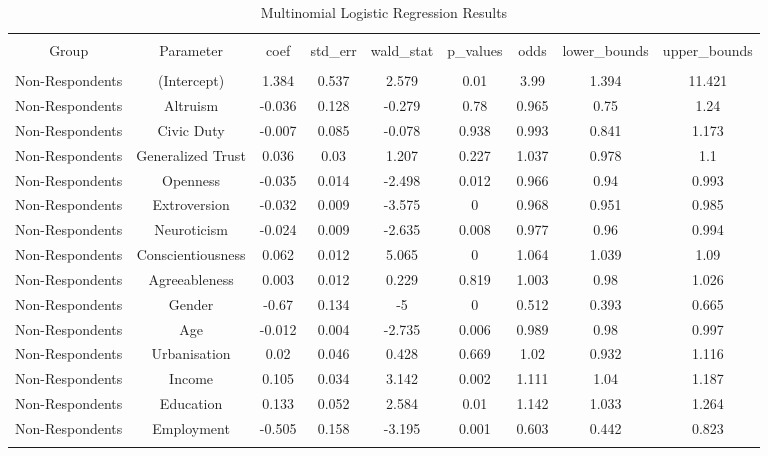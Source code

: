 
\begin{table}[!htbp] \centering 
  \caption{Multinomial Logistic Regression Results} 
  \label{} 
\begin{tabular}{@{\extracolsep{5pt}} ccccccccc} 
\\[-1.8ex]\hline 
\hline \\[-1.8ex] 
Group & Parameter & coef & std\_err & wald\_stat & p\_values & odds & lower\_bounds & upper\_bounds \\ 
\hline \\[-1.8ex] 
Non-Respondents & (Intercept) & 1.384 & 0.537 & 2.579 & 0.01 & 3.99 & 1.394 & 11.421 \\ 
Non-Respondents & Altruism & -0.036 & 0.128 & -0.279 & 0.78 & 0.965 & 0.75 & 1.24 \\ 
Non-Respondents & Civic Duty & -0.007 & 0.085 & -0.078 & 0.938 & 0.993 & 0.841 & 1.173 \\ 
Non-Respondents & Generalized Trust & 0.036 & 0.03 & 1.207 & 0.227 & 1.037 & 0.978 & 1.1 \\ 
Non-Respondents & Openness & -0.035 & 0.014 & -2.498 & 0.012 & 0.966 & 0.94 & 0.993 \\ 
Non-Respondents & Extroversion & -0.032 & 0.009 & -3.575 & 0 & 0.968 & 0.951 & 0.985 \\ 
Non-Respondents & Neuroticism & -0.024 & 0.009 & -2.635 & 0.008 & 0.977 & 0.96 & 0.994 \\ 
Non-Respondents & Conscientiousness & 0.062 & 0.012 & 5.065 & 0 & 1.064 & 1.039 & 1.09 \\ 
Non-Respondents & Agreeableness & 0.003 & 0.012 & 0.229 & 0.819 & 1.003 & 0.98 & 1.026 \\ 
Non-Respondents & Gender & -0.67 & 0.134 & -5 & 0 & 0.512 & 0.393 & 0.665 \\ 
Non-Respondents & Age & -0.012 & 0.004 & -2.735 & 0.006 & 0.989 & 0.98 & 0.997 \\ 
Non-Respondents & Urbanisation & 0.02 & 0.046 & 0.428 & 0.669 & 1.02 & 0.932 & 1.116 \\ 
Non-Respondents & Income & 0.105 & 0.034 & 3.142 & 0.002 & 1.111 & 1.04 & 1.187 \\ 
Non-Respondents & Education & 0.133 & 0.052 & 2.584 & 0.01 & 1.142 & 1.033 & 1.264 \\ 
Non-Respondents & Employment & -0.505 & 0.158 & -3.195 & 0.001 & 0.603 & 0.442 & 0.823 \\ 
\hline \\[-1.8ex] 
\end{tabular} 
\end{table} 
